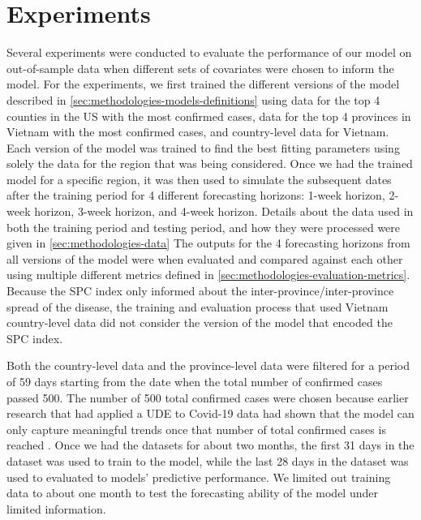 \section{Experiments}

Several experiments were conducted to evaluate the performance of our model on out-of-sample data when different sets of covariates were chosen to inform the model.
For the experiments, we first trained the different versions of the model described in \autoref{sec:methodologies-models-definitions} using data for the top 4 counties in the \gls{US} with the most confirmed cases, data for the top 4 provinces in Vietnam with the most confirmed cases, and country-level data for Vietnam.
Each version of the model was trained to find the best fitting parameters using solely the data for the region that was being considered.
Once we had the trained model for a specific region, it was then used to simulate the subsequent dates after the training period for 4 different forecasting horizons: 1-week horizon, 2-week horizon, 3-week horizon, and 4-week horizon.
Details about the data used in both the training period and testing period, and how they were processed were given in \autoref{sec:methodologies-data}
The outputs for the 4 forecasting horizons from all versions of the model were when evaluated and compared against each other using multiple different metrics defined in \autoref{sec:methodologies-evaluation-metrics}.
Because the \gls{SPC} index \cite{kuchlerGeographicSpreadCOVID192020} only informed about the inter-province/inter-province spread of the disease, the training and evaluation process that used Vietnam country-level data did not consider the version of the model that encoded the \gls{SPC} index.

Both the country-level data and the province-level data were filtered for a period of 59 days starting from the date when the total number of confirmed cases passed 500.
The number of 500 total confirmed cases were chosen because earlier research that had applied a \gls{UDE} to Covid-19 data had shown that the model can only capture meaningful trends once that number of total confirmed cases is reached \cite{dandekarMachineLearningAidedGlobal2020a}.
Once we had the datasets for about two months, the first 31 days in the dataset was used to train to the model, while the last 28 days in the dataset was used to evaluated to models' predictive performance.
We limited out training data to about one month to test the forecasting ability of the model under limited information.

